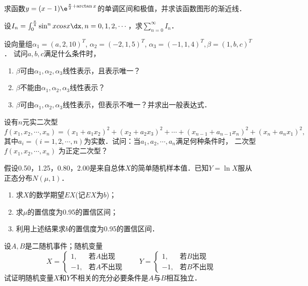 \documentclass[plain,noanswer,medmath]{../../template/jnuexam}
\begin{document}

\begin{problem}
求函数$y = (x - 1)\e^{\frac{\pi}{2} + \arctan x}$的单调区间和极值，并求该函数图形的渐近线．
\end{problem}



\begin{problem}
设$I_n = \int_0^{\frac{\pi}{4}} \sin^n xcosx\dx ,n = 0,1,2, \cdots $，求$\sum_{n = 0}^{\infty}I_n$．
\end{problem}






\begin{problem}
设向量组$\alpha_1 = (a,2,10)^T$, $\alpha_2 = (- 2,1,5)^T$, $\alpha_3 = (- 1,1,4)^T,\beta = (1,b,c)^T$．
试问$a,b,c$满足什么条件时，
\begin{enumerate}
\item $\beta$可由$\alpha_1,\alpha_2,\alpha_3$线性表示，且表示唯一？
\item $\beta$不能由$\alpha_1,\alpha_2,\alpha_3$线性表示？
\item $\beta$可由$\alpha_1,\alpha_2,\alpha_3$线性表示，但表示不唯一？并求出一般表达式．
\end{enumerate}
\end{problem}



\begin{problem}
设有$n$元实二次型
$$f(x_1,x_2, \cdots ,x_n) = (x_1 + a_1x_2)^2 + (x_2 + a_2x_3)^2 + \cdots + (x_{n - 1} + a_{n - 1}x_n)^2 + (x_n + a_n x_1)^2,$$
其中$a_i = (i = 1,2, \cdots ,n)$为实数．试问：当$a_1,a_2, \cdots ,a_n$满足何种条件时，
二次型$f(x_1,x_2, \cdots ,x_n)$ 为正定二次型？
\end{problem}



\begin{problem}
假设0.50，1.25，0.80，2.00是来自总体$X$的简单随机样本值．已知$Y = \ln X$服从正态分布$N(\mu ,1)$．
\begin{enumerate}
\item 求$X$的数学期望$EX$(记$EX$为$b$)；
\item 求$\mu$的置信度为0.95的置信区间；
\item 利用上述结果求$b$的置信度为0.95的置信区间．
\end{enumerate}
\end{problem}



\begin{problem}
设$A,B$是二随机事件；随机变量
$$X = \begin{cases}
   1, & \text{若$A$出现} \\
  -1, & \text{若$A$不出现}
\end{cases}\qquad Y = \begin{cases}
   1, & \text{若$B$出现} \\
  -1, & \text{若$B$不出现}
\end{cases}$$
试证明随机变量$X$和$Y$不相关的充分必要条件是$A$与$B$相互独立．
\end{problem}
\end{document}
